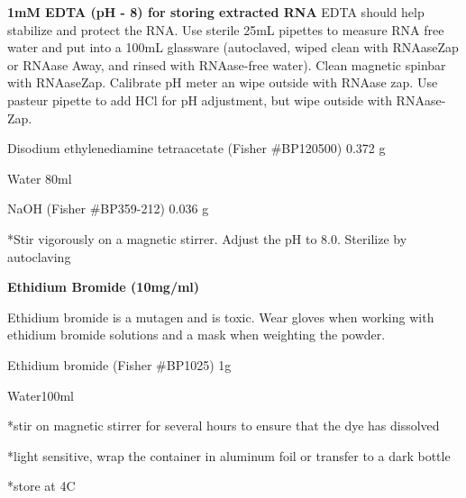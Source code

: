 \documentclass[11pt, oneside]{article}
\begin{document}
		{\bf 1mM EDTA (pH - 8) for storing extracted RNA}
		EDTA should help stabilize and protect the RNA.  Use sterile 25mL pipettes to measure RNA free water and put into a 100mL glassware (autoclaved, wiped clean with RNAaseZap or RNAase Away, and rinsed with RNAase-free water).  Clean magnetic spinbar with RNAaseZap.  Calibrate pH meter an wipe outside with RNAase zap.  Use pasteur pipette to add HCl for pH adjustment, but wipe outside with RNAase-Zap.

			\hspace{2mm}Disodium ethylenediamine tetraacetate 	(Fisher \#BP120500)\hspace{3mm}		0.372 g

			\hspace{2mm}Water\hspace{95mm}												80ml

			\hspace{2mm}NaOH\hspace{55mm}	(Fisher \#BP359-212) \hspace{1mm}	0.036 g

			\hspace{2mm}*Stir vigorously on a magnetic stirrer. Adjust the pH to 8.0. Sterilize by autoclaving

		\vspace{5mm}
		
		
		{\bf Ethidium Bromide (10mg/ml)}

		 Ethidium bromide is a mutagen and is toxic. Wear gloves when working with ethidium bromide solutions and a mask 			when weighting the powder. 
		
		\vspace{2mm}
		
			\hspace{2mm}Ethidium bromide (Fisher \#BP1025)	\hspace{2mm}1g

			\hspace{2mm}Water\hspace{56mm}100ml

			\hspace{2mm}*stir on magnetic stirrer for several hours to ensure that the dye has dissolved

			\hspace{2mm}*light sensitive, wrap the container in aluminum foil or transfer to a dark bottle

			\hspace{2mm}*store at 4C
\end{document}

